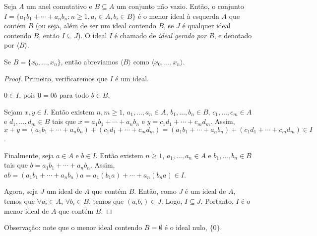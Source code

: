 \begin{prop}
    Seja $A$ um anel comutativo e $B\subseteq A$ um conjunto não vazio. Então, o conjunto $I=\{a_1b_1+\cdots+a_nb_n: n\geq 1, a_i \in A, b_i \in B\}$ é o menor ideal à esquerda $A$ que contém $B$ (ou seja, além de ser um ideal contendo $B$, se $J$ é qualquer ideal contendo $B$, então $I\subseteq J$). O ideal $I$ é chamado de \emph{ideal gerado por $B$}, e denotado por $\langle B \rangle$.
    
    Se $B=\{x_0, \dots, x_n\}$, então abreviamos $\langle B \rangle$ como $\langle x_0, \dots, x_n \rangle$.
\end{prop}
\begin{proof}
    Primeiro, verificaremos que $I$ é um ideal.

    $0 \in I$, pois $0=0b$ para todo $b \in B$.

    Sejam $x, y \in I$. Então existem $n, m\geq 1$, $a_1, \dots, a_n \in A$, $b_1, \dots, b_n \in B$, $c_1, \dots, c_m \in A$ e $d_1, \dots, d_m \in B$ tais que $x=a_1b_1+\cdots+a_nb_n$ e $y=c_1d_1+\cdots+c_md_m$. Assim, $x+y=(a_1b_1+\cdots+a_nb_n)+(c_1d_1+\cdots+c_md_m)=(a_1b_1+\cdots+a_nb_n)+(c_1d_1+\cdots+c_md_m) \in I$.

    Finalmente, seja $a \in A$ e $b \in I$. Então existem $n\geq 1$, $a_1, \dots, a_n \in A$ e $b_1, \dots, b_n \in B$ tais que $b=a_1b_1+\cdots+a_nb_n$. Assim, $ab=(a_1b_1+\cdots+a_nb_n)a=a_1(b_1a)+\cdots+a_n(b_na) \in I$.

    Agora, seja $J$ um ideal de $A$ que contém $B$. Então, como $J$ é um ideal de $A$, temos que $\forall a_i\in A$, $\forall b_i\in B$, temos que $(a_i b_i)\in J$. Logo, $I\subseteq J$. Portanto, $I$ é o menor ideal de $A$ que contém $B$.
\end{proof}

Observação: note que o menor ideal contendo $B=\emptyset$ é o ideal nulo, $\{0\}$.

